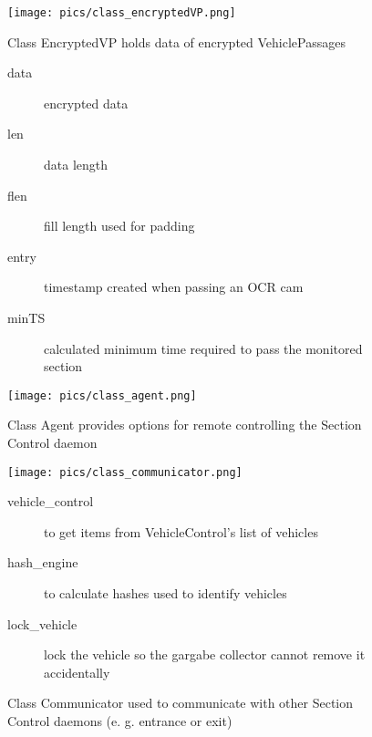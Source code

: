 \documentclass[oneside,bachelor,etd]{BYUPhys}
\begin{document}
\begin{figure}[p]
    \centerline{\texttt{[image: pics/class\_encryptedVP.png]}}
    \caption[Class EncryptedVP]{\label{fig:Class EncryptedVP}
	Class EncryptedVP holds data of encrypted VehiclePassages}
	
	\begin{description}
	\item[data] encrypted data
	\item[len] data length
	\item[flen] fill length used for padding
	\item[entry] timestamp created when passing an OCR cam
	\item[minTS] calculated minimum time required to pass the monitored section
	\end{description}

    \centerline{\texttt{[image: pics/class\_agent.png]}}
    \caption[Class Agent]{\label{fig:Class Agent}
	Class Agent provides options for remote controlling the Section Control daemon}
\end{figure}

\begin{figure}[p]
    \centerline{\texttt{[image: pics/class\_communicator.png]}}
    \caption[Class Communicator]{\label{fig:Class Communicator}
	Class Communicator used to communicate with other Section Control daemons (e. g. entrance or exit)}
	
	\begin{description}
	\item[vehicle\_control] to get items from VehicleControl's list of vehicles
	\item[hash\_engine] to calculate hashes used to identify vehicles
	\item[lock\_vehicle] lock the vehicle so the gargabe collector cannot remove it accidentally
	\end{description}
\end{figure}
\end{document}
